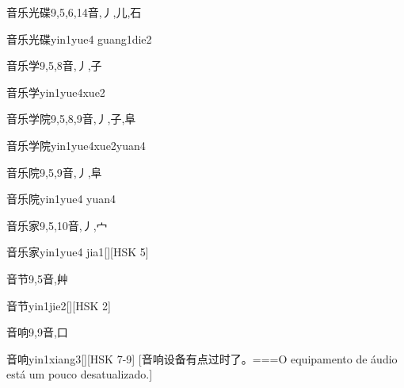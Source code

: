 \begin{Entry}{音乐光碟}{9,5,6,14}{⾳,⼃,⼉,⽯}
  \begin{Phonetics}{音乐光碟}{yin1yue4 guang1die2}
  \end{Phonetics}
\end{Entry}

\begin{Entry}{音乐学}{9,5,8}{⾳,⼃,⼦}
  \begin{Phonetics}{音乐学}{yin1yue4xue2}
  \end{Phonetics}
\end{Entry}

\begin{Entry}{音乐学院}{9,5,8,9}{⾳,⼃,⼦,⾩}
  \begin{Phonetics}{音乐学院}{yin1yue4xue2yuan4}
  \end{Phonetics}
\end{Entry}

\begin{Entry}{音乐院}{9,5,9}{⾳,⼃,⾩}
  \begin{Phonetics}{音乐院}{yin1yue4 yuan4}
  \end{Phonetics}
\end{Entry}

\begin{Entry}{音乐家}{9,5,10}{⾳,⼃,⼧}
  \begin{Phonetics}{音乐家}{yin1yue4 jia1}[][HSK 5]
  \end{Phonetics}
\end{Entry}

\begin{Entry}{音节}{9,5}{⾳,⾋}
  \begin{Phonetics}{音节}{yin1jie2}[][HSK 2]
  \end{Phonetics}
\end{Entry}

\begin{Entry}{音响}{9,9}{⾳,⼝}
  \begin{Phonetics}{音响}{yin1xiang3}[][HSK 7-9]
    [音响设备有点过时了。===O equipamento de áudio está um pouco desatualizado.]
  \end{Phonetics}
\end{Entry}

